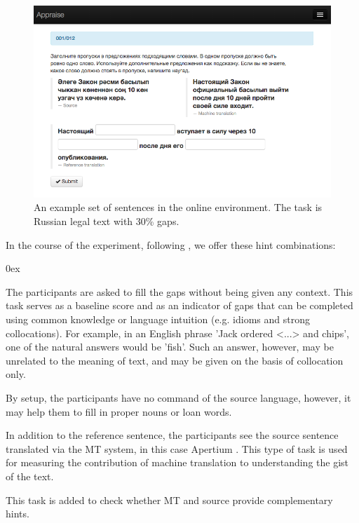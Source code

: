 \documentclass[11pt]{article}
\begin{document}
\begin{figure}
  \centering
\includegraphics[width=1.0\textwidth,resolution=144]{appraise-scr}
 \caption{An example set of sentences in the online environment. The task is Russian legal text with 30\% gaps.}
\label{figure:screenshot}
\end{figure}

In the course of the experiment, following \cite{oregan13}, we offer these hint combinations:
\begin{description}\itemsep 0ex
\item[Reference sentence only:] The participants are asked to fill the gaps without being given
any context. This task serves as a baseline score and as an indicator of gaps
that can be completed using common knowledge or language intuition (e.g.
idioms and strong collocations). For example, in an English phrase 'Jack ordered <...> and chips', one of the natural answers would be 'fish'. Such an answer, however, may be unrelated to the meaning of text, and may be given on the basis of collocation only.
\item[Reference sentence and source sentence:] By setup, the
participants have no command of the source language, however, it may help them to fill
in proper nouns or loan words.
\item[Reference sentence and MT hint:] In addition to the reference sentence, the
participants see the source sentence translated via the MT system, in this case Apertium \citep{forcada11}. This type of task is
used for measuring the contribution of machine translation to understanding the
gist of the text.
\item[Reference sentence and both hints:] This task is
added to check whether MT and source provide complementary hints.
\end{description}
\end{document}
